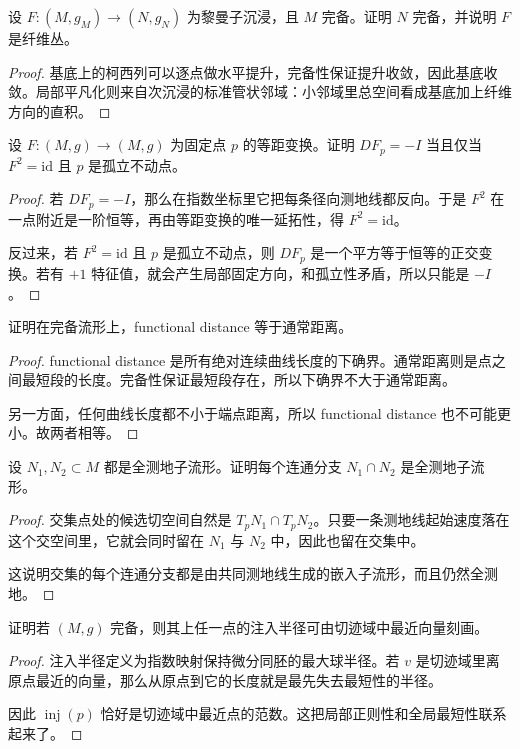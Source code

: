 \documentclass[11pt,a4paper,openany]{ctexbook}
\numberwithin{equation}{chapter}
\begin{document}
\begin{exercise}
设 \(F\colon(M,g_M)\to(N,g_N)\) 为黎曼子沉浸，且 \(M\) 完备。证明 \(N\) 完备，并说明 \(F\) 是纤维丛。
\end{exercise}
\begin{proof}
基底上的柯西列可以逐点做水平提升，完备性保证提升收敛，因此基底收敛。局部平凡化则来自次沉浸的标准管状邻域：小邻域里总空间看成基底加上纤维方向的直积。
\end{proof}

\begin{exercise}
设 \(F\colon(M,g)\to(M,g)\) 为固定点 \(p\) 的等距变换。证明 \(DF_p=-I\) 当且仅当 \(F^2=\mathrm{id}\) 且 \(p\) 是孤立不动点。
\end{exercise}
\begin{proof}
若 \(DF_p=-I\)，那么在指数坐标里它把每条径向测地线都反向。于是 \(F^2\) 在一点附近是一阶恒等，再由等距变换的唯一延拓性，得 \(F^2=\mathrm{id}\)。

反过来，若 \(F^2=\mathrm{id}\) 且 \(p\) 是孤立不动点，则 \(DF_p\) 是一个平方等于恒等的正交变换。若有 \(+1\) 特征值，就会产生局部固定方向，和孤立性矛盾，所以只能是 \(-I\)。
\end{proof}

\begin{exercise}
证明在完备流形上，functional distance 等于通常距离。
\end{exercise}
\begin{proof}
functional distance 是所有绝对连续曲线长度的下确界。通常距离则是点之间最短段的长度。完备性保证最短段存在，所以下确界不大于通常距离。

另一方面，任何曲线长度都不小于端点距离，所以 functional distance 也不可能更小。故两者相等。
\end{proof}

\begin{exercise}
设 \(N_1,N_2\subset M\) 都是全测地子流形。证明每个连通分支 \(N_1\cap N_2\) 是全测地子流形。
\end{exercise}
\begin{proof}
交集点处的候选切空间自然是 \(T_pN_1\cap T_pN_2\)。只要一条测地线起始速度落在这个交空间里，它就会同时留在 \(N_1\) 与 \(N_2\) 中，因此也留在交集中。

这说明交集的每个连通分支都是由共同测地线生成的嵌入子流形，而且仍然全测地。
\end{proof}

\begin{exercise}
证明若 \((M,g)\) 完备，则其上任一点的注入半径可由切迹域中最近向量刻画。
\end{exercise}
\begin{proof}
注入半径定义为指数映射保持微分同胚的最大球半径。若 \(v\) 是切迹域里离原点最近的向量，那么从原点到它的长度就是最先失去最短性的半径。

因此 \(\operatorname{inj}(p)\) 恰好是切迹域中最近点的范数。这把局部正则性和全局最短性联系起来了。
\end{proof}
\end{document}
